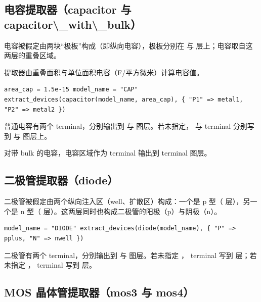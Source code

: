 \subsection{电容提取器（capacitor 与 capacitor\textbackslash{}\_with\textbackslash{}\_bulk）}

电容被假定由两块“极板”构成（即纵向电容），极板分别在  与  层上；电容取自这两层的重叠区域。


提取器由重叠面积与单位面积电容（F/平方微米）计算电容值。

\begin{lstlisting}
area_cap = 1.5e-15 model_name = "CAP" extract_devices(capacitor(model_name, area_cap), { "P1" => metal1, "P2" => metal2 })
\end{lstlisting}

普通电容有两个 terminal，分别输出到  与  图层。若未指定， 与  terminal 分别写到  与  图层上。


对带 bulk 的电容，电容区域作为  terminal 输出到  terminal 图层。


\subsection{二极管提取器（diode）}

二极管被假定由两个纵向注入区（well、扩散区）构成：一个是 p 型（ 层），另一个是 n 型（ 层）。这两层同时也构成二极管的阳极（p）与阴极（n）。


\begin{lstlisting}
model_name = "DIODE" extract_devices(diode(model_name), { "P" => pplus, "N" => nwell })
\end{lstlisting}

二极管有两个 terminal，分别输出到  与  图层。若未指定 ， terminal 写到  层；若未指定 ， terminal 写到  层。


\subsection{MOS 晶体管提取器（mos3 与 mos4）}

